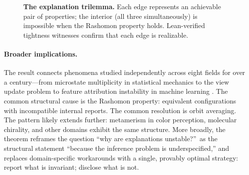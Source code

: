 \documentclass[11pt]{article}
\begin{document}

\begin{figure}[t]
\centering
{}
\caption{\textbf{The explanation trilemma.}  Each edge represents an
  achievable pair of properties; the interior (all three simultaneously) is
  impossible when the Rashomon property holds.  Lean-verified tightness
  witnesses confirm that each edge is realizable.}
\label{fig:trilemma}
\end{figure}

\paragraph{Broader implications.}
The result connects phenomena studied independently across eight fields
for over a century---from microstate multiplicity in statistical mechanics
to the view update problem \citep{bancilhon1981update} to feature
attribution instability in machine learning \citep{bilodeau2024impossibility}.
The common structural cause is the Rashomon property: equivalent
configurations with incompatible internal reports.  The common resolution is
orbit averaging.  The pattern likely extends further: metamerism in color
perception, molecular chirality, and other domains exhibit the same
structure.  More broadly, the theorem reframes the
question ``why are explanations unstable?''\ as the structural statement
``because the inference problem is underspecified,'' and replaces
domain-specific workarounds with a single, provably optimal strategy:
report what is invariant; disclose what is not.
\end{document}
